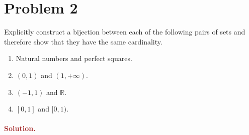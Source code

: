 \section*{Problem 2}
Explicitly construct a bijection between each of the following pairs of sets and therefore show that they have the same cardinality.
\begin{enumerate}
    \item Natural numbers and perfect squares.
    \item $(0, 1)$ and $(1, +\infty)$.
    \item $(-1, 1)$ and $\mathbb{R}$.
    \item $[0, 1]$ and $[0, 1)$.
\end{enumerate}


\paragraph{\textcolor{brown}{Solution.}}
